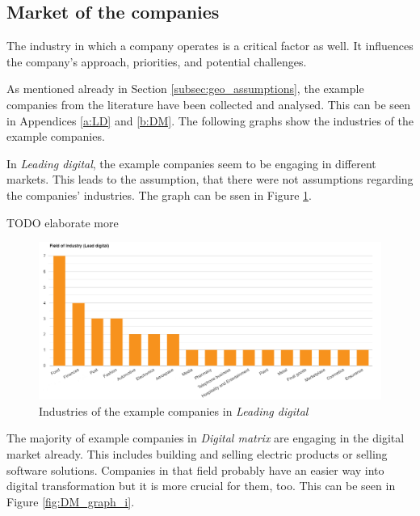 \documentclass[a4]{scrartcl}
\begin{document}
\subsection{Market of the companies} \label{subsec:market_assumptions}

The industry in which a company operates  is a critical factor as well. It influences the company's approach, priorities, and potential challenges.

As mentioned already in Section \ref{subsec:geo_assumptions}, the example companies from the literature have been collected and analysed. This can be seen in Appendices \ref{a:LD} and \ref{b:DM}. The following graphs show the industries of the example companies.

In \textit{Leading digital}, the example companies seem to be engaging in different markets. This leads to the assumption, that there were not assumptions regarding the companies' industries. The graph can be ssen in Figure \ref{fig:LD_graph_i}.

TODO elaborate more


\begin{figure}[h!]
	\centering
	\includegraphics[width=1\textwidth]{images/LD_graph_i.png}
	\caption{Industries of the example companies in \textit{Leading digital} \cite{leadingdigital}}
	\label{fig:LD_graph_i}
\end{figure}

The majority of example companies in \textit{Digital matrix} are engaging in the digital market already. This includes building and selling electric products or selling software solutions. Companies in that field probably have an easier way into digital transformation but it is more crucial for them, too. This can be seen in Figure \ref{fig:DM_graph_i}. \cite{digitalmatrix}
\end{document}
